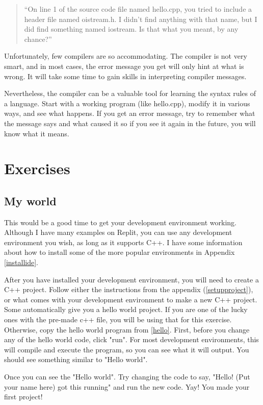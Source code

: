 \begin{quote}
``On line 1 of the source code file named hello.cpp, you tried to
include a header file named oistream.h.  I didn't find anything
with that name, but I did find something named iostream.  Is
that what you meant, by any chance?''
\end{quote}

Unfortunately, few compilers are so accommodating.  The compiler
is not very smart, and in most cases, the error message
you get will only hint at what is wrong.  It will take
some time to gain skills in interpreting compiler messages.

Nevertheless, the compiler can be a valuable tool for learning the
syntax rules of a language.  Start with a working program
(like hello.cpp), modify it in various ways, and see what happens.
If you get an error message, try to remember what the message says
and what caused it so if you see it again in the future, you
will know what it means.

\section{Exercises}
\subsection{My world}
This would be a good time to get your development environment working.
Although I have many examples on Replit, you can use any development
environment you wish, as long as it supports C++.
I have some information about how to install some of the more popular
environments in Appendix \ref{installide}.

After you have installed your development environment, you will need to create a C++ project. Follow either the instructions from the appendix (\ref{setupproject}), or what comes with
your development environment to make a new C++ project. Some automatically
give you a hello world project. If you are one of the lucky ones with the
pre-made c++ file, you will be using that for this exercise. Otherwise, copy the hello
world program from \ref{hello}. First, before you change any of the hello world code, click
"run". For most development environments, this will compile and execute 
the program, so you can see what it will output. You should see something
similar to "Hello world". 

Once you can see the "Hello world". Try changing the code to say, "Hello!
(Put your name here) got this running" and run the new code. Yay! You
made your first project!

